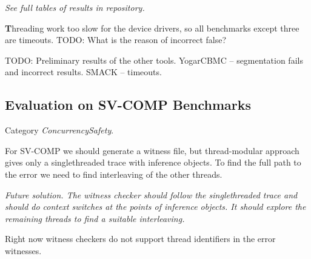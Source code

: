 
{\em See full tables of results in repository.}

{\textbf Threading} work too slow for the device drivers, so all benchmarks except three are timeouts. TODO: What is the reason of incorrect false?

TODO: Preliminary results of the other tools.
YogarCBMC -- segmentation fails and incorrect results.
SMACK -- timeouts.

\subsection{Evaluation on SV-COMP Benchmarks}
Category {\em ConcurrencySafety}.

For SV-COMP we should generate a witness file, but thread-modular approach gives only a singlethreaded trace with inference objects. To find the full path to the error we need to find interleaving of the other threads.

{\em Future solution. The witness checker should follow the singlethreaded trace and should do context switches at the points of inference objects. It should explore the remaining threads to find a suitable interleaving.}

Right now witness checkers do not support thread identifiers in the error witnesses.

